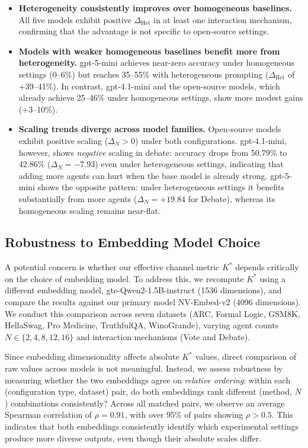 \documentclass{article}
\theoremstyle{plain}
\theoremstyle{definition}
\theoremstyle{remark}
\begin{document}
\begin{itemize}[nosep,leftmargin=*]
    \item \textbf{Heterogeneity consistently improves over homogeneous baselines.}
    All five models exhibit positive $\Delta_\text{Het}$ in at least one interaction mechanism, confirming that the advantage is not specific to open-source settings.

    \item \textbf{Models with weaker homogeneous baselines benefit more from heterogeneity.}
    gpt-5-mini achieves near-zero accuracy under homogeneous settings (0--6\%) but reaches 35--55\% with heterogeneous prompting ($\Delta_\text{Het}$ of +39--41\%).
    In contrast, gpt-4.1-mini and the open-source models, which already achieve 25--46\% under homogeneous settings, show more modest gains (+3--10\%).

    \item \textbf{Scaling trends diverge across model families.}
    Open-source models exhibit positive scaling ($\Delta_N > 0$) under both configurations.
    gpt-4.1-mini, however, shows \emph{negative} scaling in debate: accuracy drops from 50.79\% to 42.86\% ($\Delta_N = -7.93$) even under heterogeneous settings, indicating that adding more agents can hurt when the base model is already strong.
    gpt-5-mini shows the opposite pattern: under heterogeneous settings it benefits substantially from more agents ($\Delta_N = +19.84$ for Debate), whereas its homogeneous scaling remains near-flat.
\end{itemize}


\subsection{Robustness to Embedding Model Choice}
\label{sec:embedding_robustness}

A potential concern is whether our effective channel metric $K^*$ depends critically on the choice of embedding model. To address this, we recompute $K^*$ using a different embedding model, gte-Qwen2-1.5B-instruct (1536 dimensions), and compare the results against our primary model NV-Embed-v2 (4096 dimensions). We conduct this comparison across seven datasets (ARC, Formal Logic, GSM8K, HellaSwag, Pro Medicine, TruthfulQA, WinoGrande), varying agent counts $N \in \{2, 4, 8, 12, 16\}$ and interaction mechanisms (Vote and Debate).

Since embedding dimensionality affects absolute $K^*$ values, direct comparison of raw values across models is not meaningful. Instead, we assess robustness by measuring whether the two embeddings agree on \emph{relative ordering}: within each (configuration type, dataset) pair, do both embeddings rank different (method, $N$) combinations consistently? Across all matched pairs, we observe an average Spearman correlation of $\rho = 0.91$, with over 95\% of pairs showing $\rho > 0.5$. This indicates that both embeddings consistently identify which experimental settings produce more diverse outputs, even though their absolute scales differ.
\end{document}
